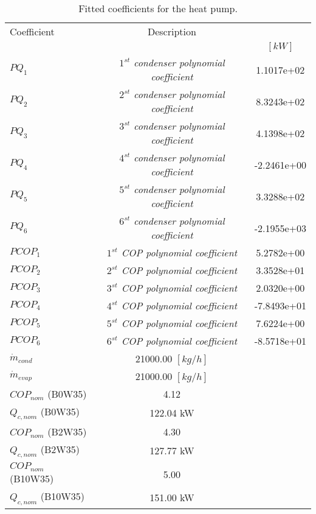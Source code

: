 \documentclass[english]{SPFShortReport}
\author{Dani Carbonell}
\begin{document}
\begin{table}[!ht]
\begin{small}
\caption{Fitted coefficients for the heat pump.}
\begin{center}
\resizebox{12cm}{!} 
{
\begin{tabular}{l | c c } 
\hline
\hline
Coefficient &Description & \\ 
 & &$[kW]$\\ 
\hline
$PQ_{1}$ & \emph{$1^{st}$ condenser polynomial coefficient}  & 1.1017e+02    \\ 
$PQ_{2}$ & \emph{$2^{st}$ condenser polynomial coefficient}  & 8.3243e+02    \\ 
$PQ_{3}$ & \emph{$3^{st}$ condenser polynomial coefficient}  & 4.1398e+02    \\ 
$PQ_{4}$ & \emph{$4^{st}$ condenser polynomial coefficient}  & -2.2461e+00    \\ 
$PQ_{5}$ & \emph{$5^{st}$ condenser polynomial coefficient}  & 3.3288e+02    \\ 
$PQ_{6}$ & \emph{$6^{st}$ condenser polynomial coefficient}  & -2.1955e+03    \\ 
\hline
$PCOP_{1}$ & \emph{$1^{st}$ COP polynomial coefficient}  & 5.2782e+00    \\ 
$PCOP_{2}$ & \emph{$2^{st}$ COP polynomial coefficient}  & 3.3528e+01    \\ 
$PCOP_{3}$ & \emph{$3^{st}$ COP polynomial coefficient}  & 2.0320e+00    \\ 
$PCOP_{4}$ & \emph{$4^{st}$ COP polynomial coefficient}  & -7.8493e+01    \\ 
$PCOP_{5}$ & \emph{$5^{st}$ COP polynomial coefficient}  & 7.6224e+00    \\ 
$PCOP_{6}$ & \emph{$6^{st}$ COP polynomial coefficient}  & -8.5718e+01    \\ 
\hline
$\dot m_{cond}$ & 21000.00 $[kg/h]$\\ 
$\dot m_{evap}$ & 21000.00 $[kg/h]$\\ 
\hline
$COP_{nom}$ (B0W35)& 4.12 \\ 
$Q_{c,nom}$ (B0W35)& 122.04 kW\\ 
$COP_{nom}$ (B2W35)& 4.30 \\ 
$Q_{c,nom}$ (B2W35)& 127.77 kW\\ 
$COP_{nom}$ (B10W35)& 5.00 \\ 
$Q_{c,nom}$ (B10W35)& 151.00 kW\\ 
\hline
\hline
\end{tabular}
}
\label{CoefTable}
\end{center}
\end{small}
\end{table}
\end{document}
